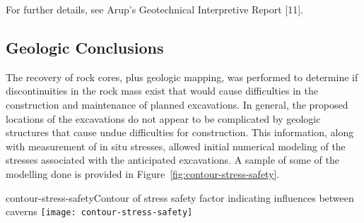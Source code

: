 For further details, see Arup's Geotechnical Interpretive Report [11]. 

\subsection{Geologic Conclusions}
\label{sec:fscf-site-cond-geo-concl}

The recovery of rock cores, plus geologic mapping, was performed to determine if discontinuities in the rock mass exist that would cause difficulties in the construction and maintenance of planned excavations. In general, the proposed locations of the excavations do not appear to be complicated by geologic structures that cause undue difficulties for construction. This information, along with measurement of in situ stresses, allowed initial numerical modeling of the stresses associated with the anticipated excavations. A sample of some of the modelling done is provided in Figure~\ref{fig:contour-stress-safety}.

\begin{cdrfigure}{contour-stress-safety}{Contour of stress safety factor indicating influences between caverns}
\texttt{[image: contour-stress-safety]}
\end{cdrfigure}

